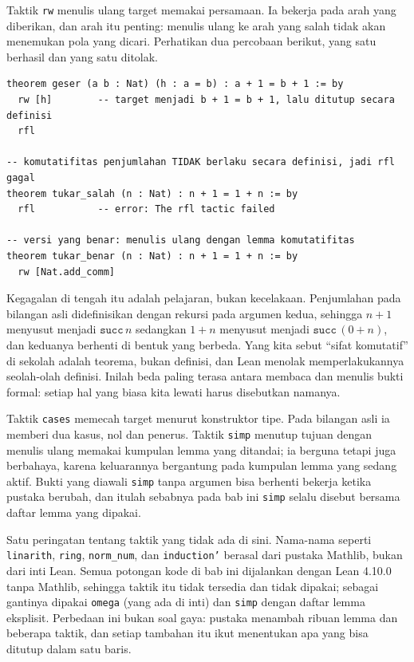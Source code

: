 Taktik \texttt{rw} menulis ulang target memakai persamaan. Ia bekerja pada arah yang diberikan,
dan arah itu penting: menulis ulang ke arah yang salah tidak akan menemukan pola yang dicari.
Perhatikan dua percobaan berikut, yang satu berhasil dan yang satu ditolak.

\begin{verbatim}
theorem geser (a b : Nat) (h : a = b) : a + 1 = b + 1 := by
  rw [h]        -- target menjadi b + 1 = b + 1, lalu ditutup secara definisi
  rfl

-- komutatifitas penjumlahan TIDAK berlaku secara definisi, jadi rfl gagal
theorem tukar_salah (n : Nat) : n + 1 = 1 + n := by
  rfl           -- error: The rfl tactic failed

-- versi yang benar: menulis ulang dengan lemma komutatifitas
theorem tukar_benar (n : Nat) : n + 1 = 1 + n := by
  rw [Nat.add_comm]
\end{verbatim}

Kegagalan di tengah itu adalah pelajaran, bukan kecelakaan. Penjumlahan pada bilangan asli
didefinisikan dengan rekursi pada argumen kedua, sehingga $n+1$ menyusut menjadi
$\mathtt{succ}\,n$ sedangkan $1+n$ menyusut menjadi $\mathtt{succ}\,(0+n)$, dan keduanya berhenti
di bentuk yang berbeda. Yang kita sebut ``sifat komutatif'' di sekolah adalah teorema, bukan
definisi, dan Lean menolak memperlakukannya seolah-olah definisi. Inilah beda paling terasa antara
membaca dan menulis bukti formal: setiap hal yang biasa kita lewati harus disebutkan namanya.

Taktik \texttt{cases} memecah target menurut konstruktor tipe. Pada bilangan asli ia memberi dua
kasus, nol dan penerus. Taktik \texttt{simp} menutup tujuan dengan menulis ulang memakai kumpulan
lemma yang ditandai; ia berguna tetapi juga berbahaya, karena keluarannya bergantung pada
kumpulan lemma yang sedang aktif. Bukti yang diawali \texttt{simp} tanpa argumen bisa berhenti
bekerja ketika pustaka berubah, dan itulah sebabnya pada bab ini \texttt{simp} selalu disebut
bersama daftar lemma yang dipakai.

Satu peringatan tentang taktik yang tidak ada di sini. Nama-nama seperti \texttt{linarith},
\texttt{ring}, \texttt{norm\_num}, dan \texttt{induction'} berasal dari pustaka Mathlib, bukan
dari inti Lean. Semua potongan kode di bab ini dijalankan dengan Lean 4.10.0 tanpa Mathlib,
sehingga taktik itu tidak tersedia dan tidak dipakai; sebagai gantinya dipakai \texttt{omega}
(yang ada di inti) dan \texttt{simp} dengan daftar lemma eksplisit. Perbedaan ini bukan soal
gaya: pustaka menambah ribuan lemma dan beberapa taktik, dan setiap tambahan itu ikut menentukan
apa yang bisa ditutup dalam satu baris.

